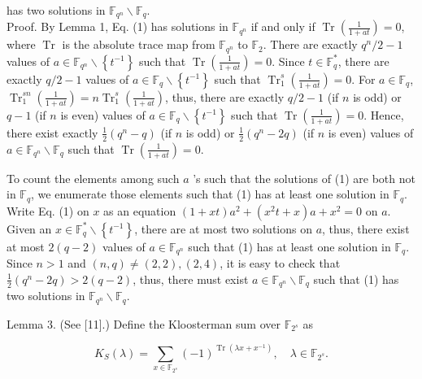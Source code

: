 \documentclass[10pt]{article}
\begin{document}
has two solutions in $\mathbb{F}_{q^{n}} \backslash \mathbb{F}_{q}$.\\
Proof. By Lemma 1, Eq. (1) has solutions in $\mathbb{F}_{q^{n}}$ if and only if $\operatorname{Tr}\left(\frac{1}{1+a t}\right)=0$, where $\operatorname{Tr}$ is the absolute trace map from $\mathbb{F}_{q^{n}}$ to $\mathbb{F}_{2}$. There are exactly $q^{n} / 2-1$ values of $a \in \mathbb{F}_{q^{n}} \backslash\left\{t^{-1}\right\}$ such that $\operatorname{Tr}\left(\frac{1}{1+a t}\right)=0$. Since $t \in \mathbb{F}_{q}^{*}$, there are exactly $q / 2-1$ values of $a \in \mathbb{F}_{q} \backslash\left\{t^{-1}\right\}$ such that $\operatorname{Tr}_{1}^{s}\left(\frac{1}{1+a t}\right)=0$. For $a \in \mathbb{F}_{q}$, $\operatorname{Tr}_{1}^{s n}\left(\frac{1}{1+a t}\right)=n \operatorname{Tr}_{1}^{s}\left(\frac{1}{1+a t}\right)$, thus, there are exactly $q / 2-1$ (if $n$ is odd) or $q-1$ (if $n$ is even) values of $a \in \mathbb{F}_{q} \backslash\left\{t^{-1}\right\}$ such that $\operatorname{Tr}\left(\frac{1}{1+a t}\right)=0$. Hence, there exist exactly $\frac{1}{2}\left(q^{n}-q\right)$ (if $n$ is odd) or $\frac{1}{2}\left(q^{n}-2 q\right)$ (if $n$ is even) values of $a \in \mathbb{F}_{q^{n}} \backslash \mathbb{F}_{q}$ such that $\operatorname{Tr}\left(\frac{1}{1+a t}\right)=0$.

To count the elements among such $a$ 's such that the solutions of (1) are both not in $\mathbb{F}_{q}$, we enumerate those elements such that (1) has at least one solution in $\mathbb{F}_{q}$. Write Eq. (1) on $x$ as an equation $(1+x t) a^{2}+\left(x^{2} t+x\right) a+x^{2}=0$ on $a$. Given an $x \in \mathbb{F}_{q}^{*} \backslash\left\{t^{-1}\right\}$, there are at most two solutions on $a$, thus, there exist at most $2(q-2)$ values of $a \in \mathbb{F}_{q^{n}}$ such that (1) has at least one solution in $\mathbb{F}_{q}$. Since $n>1$ and $(n, q) \neq(2,2),(2,4)$, it is easy to check that $\frac{1}{2}\left(q^{n}-2 q\right)>2(q-2)$, thus, there must exist $a \in \mathbb{F}_{q^{n}} \backslash \mathbb{F}_{q}$ such that (1) has two solutions in $\mathbb{F}_{q^{n}} \backslash \mathbb{F}_{q}$.

Lemma 3. (See [11].) Define the Kloosterman sum over $\mathbb{F}_{2^{s}}$ as

$$
K_{S}(\lambda)=\sum_{x \in \mathbb{F}_{2^{s}}}(-1)^{\operatorname{Tr}\left(\lambda x+x^{-1}\right)}, \quad \lambda \in \mathbb{F}_{2^{s}} .
$$
\end{document}

